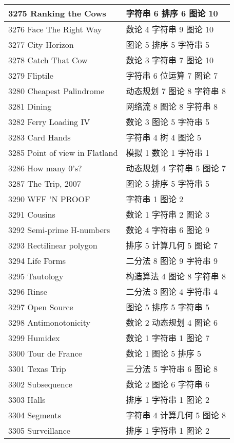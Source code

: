 \begin{longtable}{| p{} | p{} |}
 3275 Ranking the Cows  & 字符串 6 排序 6 图论 10 \\ \hline
 3276 Face The Right Way  & 数论 4 字符串 9 图论 10 \\ \hline
 3277 City Horizon  & 图论 5 排序 5 字符串 5 \\ \hline
 3278 Catch That Cow  & 数论 3 字符串 7 图论 10 \\ \hline
 3279 Fliptile  & 字符串 6 位运算 7 图论 7 \\ \hline
 3280 Cheapest Palindrome  & 动态规划 7 图论 8 字符串 8 \\ \hline
 3281 Dining  & 网络流 8 图论 8 字符串 8 \\ \hline
 3282 Ferry Loading IV  & 数论 3 图论 5 字符串 5 \\ \hline
 3283 Card Hands  & 字符串 4 树 4 图论 5 \\ \hline
 3285 Point of view in Flatland  & 模拟 1 数论 1 字符串 1 \\ \hline
 3286 How many 0's?  & 动态规划 4 字符串 5 图论 7 \\ \hline
 3287 The Trip, 2007  & 图论 5 排序 5 字符串 5 \\ \hline
 3290 WFF 'N PROOF  & 字符串 1 图论 2 \\ \hline
 3291 Cousins  & 数论 1 字符串 2 图论 3 \\ \hline
 3292 Semi-prime H-numbers  & 数论 4 字符串 6 图论 9 \\ \hline
 3293 Rectilinear polygon  & 排序 5 计算几何 5 图论 7 \\ \hline
 3294 Life Forms  & 二分法 8 图论 9 字符串 9 \\ \hline
 3295 Tautology  & 构造算法 4 图论 8 字符串 8 \\ \hline
 3296 Rinse  & 二分法 3 图论 4 字符串 4 \\ \hline
 3297 Open Source  & 图论 5 排序 5 字符串 5 \\ \hline
 3298 Antimonotonicity  & 数论 2 动态规划 4 图论 6 \\ \hline
 3299 Humidex  & 数论 1 字符串 1 图论 7 \\ \hline
 3300 Tour de France  & 数论 1 图论 5 排序 5 \\ \hline
 3301 Texas Trip  & 三分法 5 字符串 6 图论 8 \\ \hline
 3302 Subsequence  & 数论 2 图论 6 字符串 6 \\ \hline
 3303 Halls  & 排序 1 字符串 1 图论 2 \\ \hline
 3304 Segments  & 字符串 4 计算几何 5 图论 8 \\ \hline
 3305 Surveillance  & 排序 1 字符串 1 图论 2 \\ \hline

\end{longtable}
